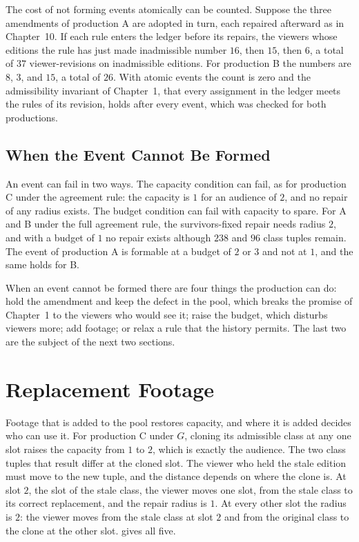 \documentclass[11pt,twoside,openright]{book}
\theoremstyle{plain}
\theoremstyle{definition}
\theoremstyle{remark}
\begin{document}
The cost of not forming events atomically can be counted. Suppose the three amendments of production A are adopted in turn, each repaired afterward as in Chapter~10. If each rule enters the ledger before its repairs, the viewers whose editions the rule has just made inadmissible number $16$, then $15$, then $6$, a total of $37$ viewer-revisions on inadmissible editions. For production B the numbers are $8$, $3$, and $15$, a total of $26$. With atomic events the count is zero and the admissibility invariant of Chapter~1, that every assignment in the ledger meets the rules of its revision, holds after every event, which was checked for both productions.

\subsection{When the Event Cannot Be Formed}

An event can fail in two ways. The capacity condition can fail, as for production C under the agreement rule: the capacity is $1$ for an audience of $2$, and no repair of any radius exists. The budget condition can fail with capacity to spare. For A and B under the full agreement rule, the survivors-fixed repair needs radius $2$, and with a budget of $1$ no repair exists although $238$ and $96$ class tuples remain. The event of production A is formable at a budget of $2$ or $3$ and not at $1$, and the same holds for B.

When an event cannot be formed there are four things the production can do: hold the amendment and keep the defect in the pool, which breaks the promise of Chapter~1 to the viewers who would see it; raise the budget, which disturbs viewers more; add footage; or relax a rule that the history permits. The last two are the subject of the next two sections.

\section{Replacement Footage}\label{sec:footage}

Footage that is added to the pool restores capacity, and where it is added decides who can use it. For production C under $G$, cloning its admissible class at any one slot raises the capacity from $1$ to $2$, which is exactly the audience. The two class tuples that result differ at the cloned slot. The viewer who held the stale edition must move to the new tuple, and the distance depends on where the clone is. At slot $2$, the slot of the stale class, the viewer moves one slot, from the stale class to its correct replacement, and the repair radius is $1$. At every other slot the radius is $2$: the viewer moves from the stale class at slot $2$ and from the original class to the clone at the other slot.  gives all five.
\end{document}
